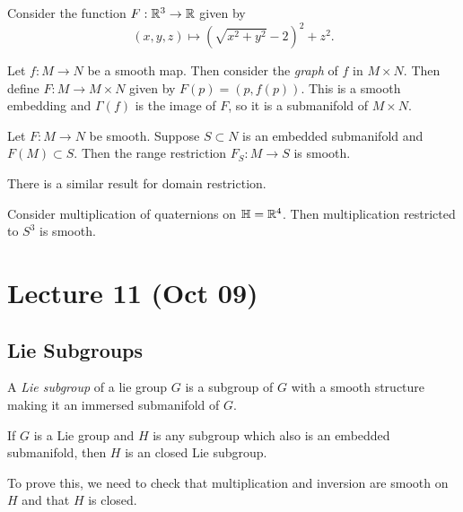 \documentclass[twoside, 10pt]{article}
\begin{document}
    \begin{exm} Consider the function $F: \mathbb{R}^3 \to \mathbb{R}$ given by \[ (x,y,z)
    \mapsto (\sqrt{x^2+y^2}-2)^2 + z^2.\] \end{exm}

    \begin{exm} Let $f: M \to N$ be a smooth map. Then consider the
        \textit{graph} of $f$ in $M \times N$. Then define $F: M \to M \times
        N$ given by $F(p) = (p,f(p))$. This is a smooth embedding and
        $\Gamma(f)$ is the image of $F$, so it is a submanifold of $M \times
        N$.  \end{exm}

    \begin{prop} Let $F: M \to N$ be smooth. Suppose $S \subset N$ is an
    embedded submanifold and $F(M) \subset S$. Then the range restriction
$F_S:M \to S$ is smooth.  \end{prop}

    \begin{rmk} There is a similar result for domain restriction.  \end{rmk}

    \begin{exm} Consider multiplication of quaternions on $\mathbb{H} = \mathbb{R}^4$.
    Then multiplication restricted to $S^3$ is smooth.  \end{exm}

    

    \section{Lecture 11 (Oct 09)}%
    
    \subsection{Lie Subgroups}%
    
    
    \begin{defn} A \textit{Lie subgroup} of a lie group $G$ is a subgroup of
    $G$ with a smooth structure making it an immersed submanifold of $G$.
\end{defn}

    \begin{prop} If $G$ is a Lie group and $H$ is any subgroup which also is an
    embedded submanifold, then $H$ is an closed Lie subgroup.  \end{prop}

    To prove this, we need to check that multiplication and inversion are
    smooth on $H$ and that $H$ is closed.
\end{document}
